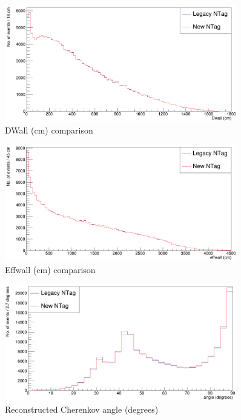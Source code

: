 \begin{figure}
    \centering
    \includegraphics[width=0.9\textwidth]{Figures/dwall_recon_compare.PNG}
    \caption{DWall (cm) comparison}
    \label{fig:dwall_recon_compare}

\end{figure}

\begin{figure}
    \centering
    \includegraphics[width=0.9\textwidth]{Figures/effwall_recon_compare.PNG}
    \caption{Effwall (cm) comparison}
    \label{fig:effwall_recon_compare}

\end{figure}

\begin{figure}
    \centering
    \includegraphics[width=0.9\textwidth]{Figures/angle_recon_compare.PNG}
    \caption{Reconstructed Cherenkov angle (degrees)}
    \label{fig:angle_recon_compare}

\end{figure}

